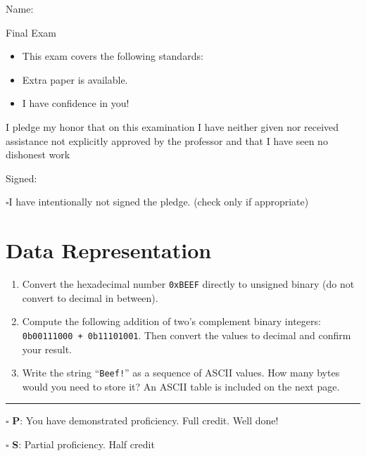 \documentclass[12pt]{article}
\begin{document}
Name: \makebox[3in]{\hrulefill
\hrulefill}

\vfill

\begin{center}
{\huge Final Exam}
\end{center}

\begin{itemize}

    \item This exam covers the following standards: %
    \item Extra paper is available. 
    \item I have confidence in you!
\end{itemize}

\vfill

I pledge my honor that on this examination I have neither given nor received assistance not explicitly approved by the professor and that I have seen no dishonest work 

\hfill Signed: \makebox[3in]{\hrulefill}

$\square$\quad I have intentionally not signed the pledge. (check only if appropriate)
\newpage


\section*{Data Representation}

\begin{enumerate}
\item Convert the hexadecimal number \texttt{0xBEEF} directly to unsigned binary (do not convert to decimal in between).
\vfill

\item Compute the following addition of two's complement binary integers: \texttt{0b00111000 + 0b11101001}. Then convert the values to decimal and confirm your result.
\vfill

\item Write the string ``\texttt{Beef!}'' as a sequence of ASCII values. How many bytes would you need to store it? An ASCII table is included on the next page.
\vfill
\end{enumerate}

\vfill

\rule[1ex]{\textwidth}{.1pt}

$\square$ \textbf{P}: You have demonstrated proficiency. Full credit. Well done!

$\square$ \textbf{S}: Partial proficiency. Half credit
\end{document}
